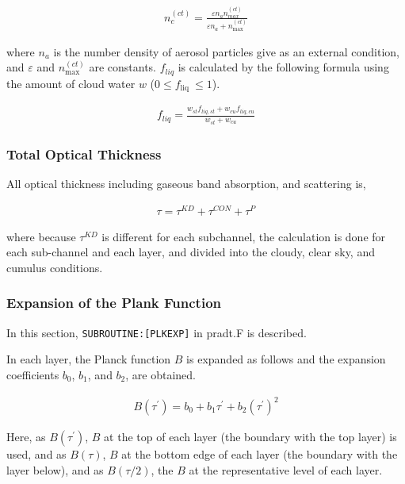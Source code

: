 \begin{eqnarray}
n_{c}^{(c t)}=\frac{\varepsilon n_{a} n_{m a x}^{(c t)}}{\varepsilon n_{a}+n_{\max }^{(c t)}}
\end{eqnarray}

where \(n_a\) is the number density of aerosol particles give as an
external condition, and \(\varepsilon\) and \(n_{\max }^{(c t)}\) are
constants. \(f_{liq}\) is calculated by the following formula using the
amount of cloud water \(w\) (\(0 \leq f_{\text {liq }} \leq 1\)).

\begin{eqnarray}
f_{l i q}=\frac{w_{s t} f_{l i q, s t}+w_{c u} f_{l i q, c u}}{w_{s t}+w_{c u}}
\end{eqnarray}

\hypertarget{total-optical-thickness}{%
\subsubsection{Total Optical Thickness}\label{total-optical-thickness}}

All optical thickness including gaseous band absorption, and scattering
is,

\begin{eqnarray}
\tau=\tau^{K D}+\tau^{C O N}+\tau^{P}
\end{eqnarray}

where because \(\tau^{K D}\) is different for each subchannel, the
calculation is done for each sub-channel and each layer, and divided
into the cloudy, clear sky, and cumulus conditions.

\hypertarget{expansion-of-the-plank-function}{%
\subsubsection{Expansion of the Plank
Function}\label{expansion-of-the-plank-function}}

In this section, \texttt{SUBROUTINE:{[}PLKEXP{]}} in pradt.F is
described.

In each layer, the Planck function \(B\) is expanded as follows and the
expansion coefficients \(b_0\), \(b_1\), and \(b_2\), are obtained.

\begin{eqnarray}
{B}\left(\tau^{\prime}\right)=b_{0}+b_{1} \tau^{\prime}+b_{2}\left(\tau^{\prime}\right)^{2}
\end{eqnarray}

Here, as \({B}\left(\tau^{\prime}\right)\), \(B\) at the top of each
layer (the boundary with the top layer) is used, and as \({B}(\tau)\),
\(B\) at the bottom edge of each layer (the boundary with the layer
below), and as \({B}(\tau / 2)\), the \(B\) at the representative level
of each layer.

